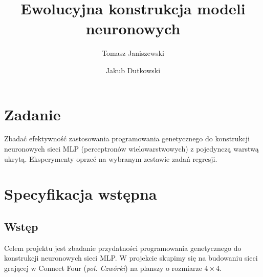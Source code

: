 \documentclass{llncs}
\begin{document}
\title{Ewolucyjna konstrukcja modeli neuronowych}
%
%
\author{Tomasz Janiszewski \and Jakub Dutkowski}
%
%


\maketitle              %

%
\section{Zadanie}
Zbadać efektywność zastosowania programowania genetycznego do konstrukcji neuronowych sieci MLP 
(perceptronów wielowarstwowych) z pojedynczą warstwą ukrytą.
Eksperymenty oprzeć na wybranym zestawie zadań regresji.

\section{Specyfikacja wstępna}

\subsection{Wstęp}
Celem projektu jest zbadanie przydatności programowania genetycznego do konstrukcji neuronowych sieci MLP.
W projekcie skupimy się na budowaniu sieci grającej w Connect Four (\emph{pol. Czwórki}) \cite{connect4:wiki}
na planszy o rozmiarze $4 \times 4$.
\end{document}
